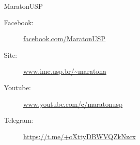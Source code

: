 \begin{subsecao}{MaratonUSP}
\begin{description}
\item[Facebook:] \url{facebook.com/MaratonUSP}
\item[Site:] \url{www.ime.usp.br/~maratona}
\item[Youtube:] \url{www.youtube.com/c/maratonusp}
\item[Telegram:] \url{https://t.me/+oXttyDBWVQZkNzcx}
\end{description}

\end{subsecao}
